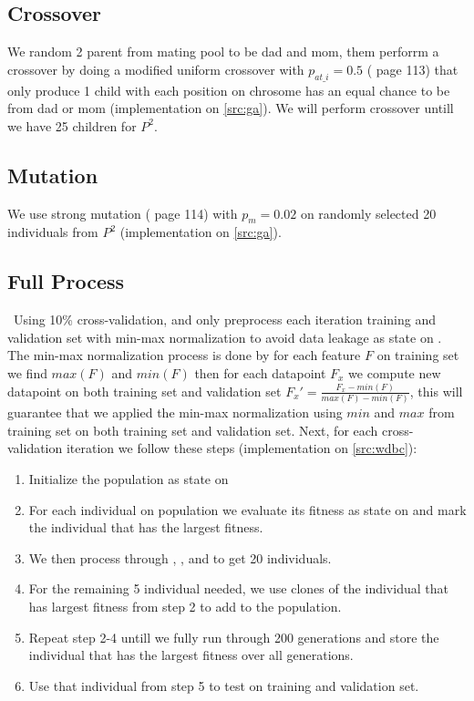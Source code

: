 \documentclass{article}
\begin{document}
\subsection*{Crossover}\label{mating}
We random 2 parent from mating pool to be dad and mom, them perforrm a crossover by doing a modified 
uniform crossover with $p_{at\_i} = 0.5$ (\cite{sansanee} page 113) that only produce 1 child with each position on chrosome 
has an equal chance to be from dad or mom (implementation on \ref{src:ga}). We will perform crossover untill we have 25 children for
$P^2$.

\subsection*{Mutation}\label{mutate}
We use strong mutation (\cite{sansanee} page 114) with $p_m = 0.02$ on randomly selected 20 individuals from $P^2$ 
(implementation on \ref{src:ga}).

\subsection*{Full Process}\
Using 10\% cross-validation, and only preprocess each iteration training and validation set with min-max normalization 
to avoid data leakage as state on \cite{dataleak}. The min-max normalization process is done by for each feature $F$ on training set
we find $max(F)$ and $min(F)$ then for each datapoint $F_x$ we compute new datapoint on both training set and 
validation set $F_x' = \frac{F_x - min(F)}{max(F) - min(F)}$, this will guarantee that we applied the min-max normalization using $min$
and $max$ from training set on both training set and validation set. Next, for each cross-validation iteration we follow these steps
(implementation on \ref{src:wdbc}):
\begin{enumerate}
    \item Initialize the population as state on 
    \item For each individual on population we evaluate its fitness as state on  and mark the individual that 
    has the largest fitness.
    \item We then process through , , and  to get 20 individuals.
    \item For the remaining 5 individual needed, we use clones of the individual that has largest fitness from step 2 to add to the
    population.
    \item Repeat step 2-4 untill we fully run through 200 generations and store the individual that has the largest fitness over all 
    generations.
    \item Use that individual from step 5 to test on training and validation set.
\end{enumerate}
\end{document}

